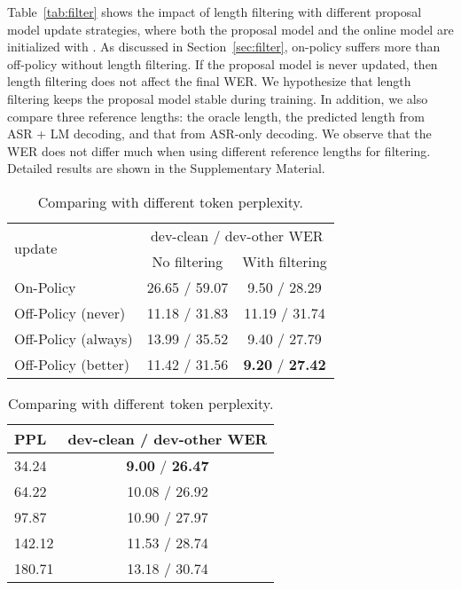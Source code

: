 Table~\ref{tab:filter} shows the impact of length filtering with different proposal model update strategies, where both the proposal model and the online model are initialized with .
As discussed in Section~\ref{sec:filter}, on-policy suffers more than off-policy without length filtering.
If the proposal model is never updated, then length filtering does not affect the final WER. We hypothesize that length filtering keeps the proposal model stable during training.
In addition, we also compare three reference lengths: the oracle length, the predicted length from ASR + LM decoding, and that from ASR-only decoding. We observe that the WER does not differ much when using different reference lengths for filtering. Detailed results are shown in the Supplementary Material.

\begin{table}[ht]
    \small
    \caption{A comparison of WER with and without length filtering.}
    \label{tab:filter}
    \begin{center}
    \begin{tabular}{lcc}
        \toprule
        \multirow{2}{*}{ update} &  
        \multicolumn{2}{c}{dev-clean / dev-other WER} \\
        & No filtering & With filtering \\ 
        \midrule
        On-Policy             & 26.65 / 59.07 &  9.50 / 28.29 \\
        Off-Policy (never)    & 11.18 / 31.83 & 11.19 / 31.74 \\
        Off-Policy (always)   & 13.99 / 35.52 &  9.40 / 27.79 \\
        Off-Policy (better)   & 11.42 / 31.56 &  \textbf{9.20} / \textbf{27.42} \\
        \bottomrule
    \end{tabular}
    \end{center}
    \caption{Comparing  with different token perplexity.}
    \label{tab:lmppl}
    \begin{center}
    \begin{tabular}{lc}
        \toprule
         PPL & dev-clean / dev-other WER \\
        \midrule
        34.24 &  \textbf{9.00} / \textbf{26.47} \\
        64.22 & 10.08 / 26.92 \\
        97.87 & 10.90 / 27.97 \\
        142.12 & 11.53 / 28.74 \\
        180.71 & 13.18 / 30.74 \\
        \bottomrule
    \end{tabular}
    \end{center}
\end{table}


